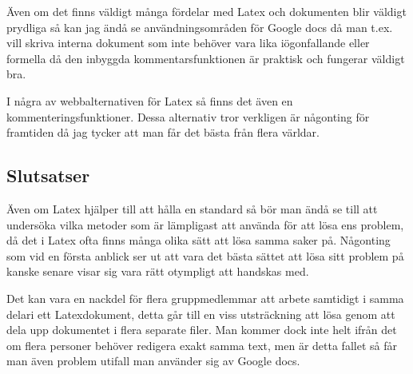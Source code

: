 
Även om det finns väldigt många fördelar med Latex och dokumenten blir väldigt prydliga så kan jag ändå se användningsområden för Google docs då man t.ex. vill skriva interna dokument som inte behöver vara lika iögonfallande eller formella då den inbyggda kommentarsfunktionen är praktisk och fungerar väldigt bra.

I några av webbalternativen för Latex så finns det även en kommenteringsfunktioner. Dessa alternativ tror verkligen är någonting för framtiden då jag tycker att man får det bästa från flera världar.


\subsection{Slutsatser}
Även om Latex hjälper till att hålla en standard så bör man ändå se till att undersöka vilka metoder som är lämpligast att använda för att lösa ens problem, då det i Latex ofta finns många olika sätt att lösa samma saker på. Någonting som vid en första anblick ser ut att vara det bästa sättet att lösa sitt problem på kanske senare visar sig vara rätt otympligt att handskas med.

Det kan vara en nackdel för flera gruppmedlemmar att arbete samtidigt i samma delari ett Latexdokument, detta går till en viss utsträckning att lösa genom att dela upp dokumentet i flera separate filer. Man kommer dock inte helt ifrån det om flera personer behöver redigera exakt samma text, men är detta fallet så får man även problem utifall man använder sig av Google docs.

